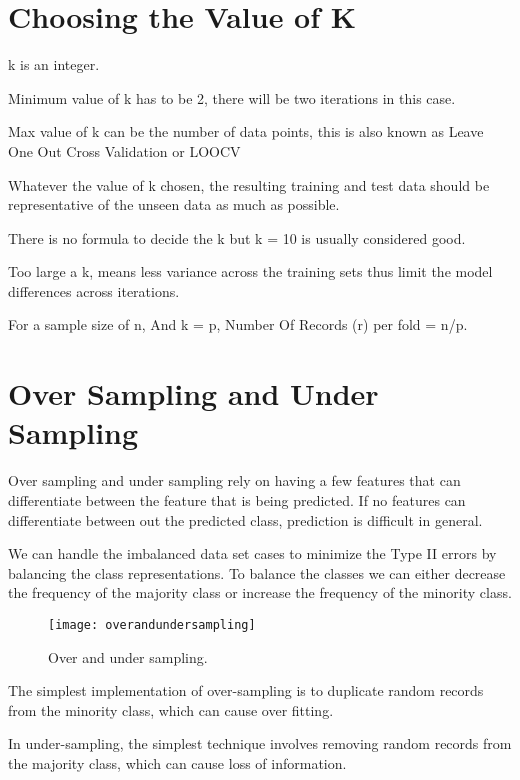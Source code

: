 	\section{Choosing the Value of K}
	\begin{bulletedlist}
		\item k is an integer.
		\item Minimum value of k has to be 2, there will be two iterations in this case.
		\item Max value of k can be the number of data points, this is also known as Leave One Out Cross Validation or LOOCV
		\item Whatever the value of k chosen, the resulting training and test data should be representative of the unseen data as much as possible.
		\item There is no formula to decide the k but k = 10 is usually considered good.
		\item Too large a k, means less variance across the training sets thus limit the model differences across iterations.
		\item For a sample size of n, And k = p, Number Of Records (r) per fold = n/p.
	\end{bulletedlist}


	\section{Over Sampling and Under Sampling}
Over sampling and under sampling rely on having a few features that can differentiate between the feature that is being predicted.  If no features can differentiate between out the predicted class, prediction is difficult in general.

We can handle the imbalanced data set cases to minimize the Type II errors by balancing the class representations.  To balance the classes we can either decrease the frequency of the majority class or increase the frequency of the minority class.
	\begin{figure}[htb]
		\centering
		\texttt{[image: overandundersampling]}
		\caption[Over and under sampling]{Over and under sampling.}
		\label{fig:overandundersampling}
	\end{figure}

The simplest implementation of over-sampling is to duplicate random records from the minority class, which can cause over fitting.

In under-sampling, the simplest technique involves removing random records from the majority class, which can cause loss of information.

